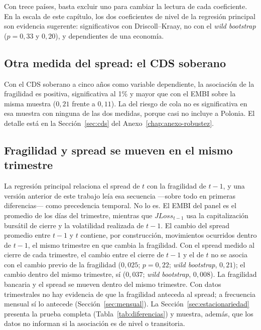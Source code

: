 Con trece países, basta excluir uno para cambiar la lectura de cada coeficiente. En la escala de este capítulo, los dos coeficientes de nivel de la regresión principal son evidencia sugerente: significativos con Driscoll--Kraay, no con el \textit{wild bootstrap} ($p=0{,}33$ y $0{,}20$), y dependientes de una economía.

\subsection{Otra medida del spread: el CDS soberano}

Con el CDS soberano a cinco años como variable dependiente, la asociación de la fragilidad es positiva, significativa al 1\% y mayor que con el EMBI sobre la misma muestra ($0{,}21$ frente a $0{,}11$). La del riesgo de cola no es significativa en esa muestra con ninguna de las dos medidas, porque casi no incluye a Polonia. El detalle está en la Sección~\ref{sec:cds} del Anexo~\ref{chap:anexo-robustez}.

\subsection{Fragilidad y spread se mueven en el mismo trimestre}
\label{sec:mismo-trimestre}

La regresión principal relaciona el spread de $t$ con la fragilidad de $t-1$, y una versión anterior de este trabajo leía esa secuencia ---sobre todo en primeras diferencias--- como precedencia temporal. No lo es. El EMBI del panel es el promedio de los días del trimestre, mientras que $JLoss_{t-1}$ usa la capitalización bursátil de cierre y la volatilidad realizada de $t-1$. El cambio del spread promedio entre $t-1$ y $t$ contiene, por construcción, movimientos ocurridos dentro de $t-1$, el mismo trimestre en que cambia la fragilidad. Con el spread medido al cierre de cada trimestre, el cambio entre el cierre de $t-1$ y el de $t$ no se asocia con el cambio previo de la fragilidad ($0{,}025$; $p=0{,}22$; \textit{wild bootstrap}, $0{,}21$); el cambio dentro del mismo trimestre, sí ($0{,}037$; \textit{wild bootstrap}, $0{,}008$). La fragilidad bancaria y el spread se mueven dentro del mismo trimestre. Con datos trimestrales no hay evidencia de que la fragilidad anteceda al spread; a frecuencia mensual sí lo antecede (Sección~\ref{sec:mensual}). La Sección~\ref{sec:estacionariedad} presenta la prueba completa (Tabla~\ref{tab:diferencias}) y muestra, además, que los datos no informan si la asociación es de nivel o transitoria.

